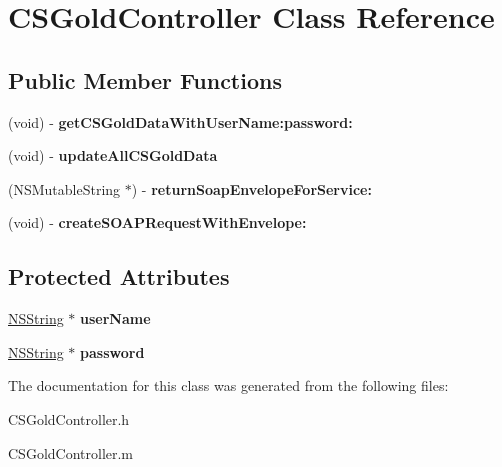 \hypertarget{interface_c_s_gold_controller}{
\section{CSGoldController Class Reference}
\label{interface_c_s_gold_controller}
}
\subsection*{Public Member Functions}
\begin{DoxyCompactItemize}
\item 
\hypertarget{interface_c_s_gold_controller_a8552228761af3e1aacc996d4c0c43e7e}{
(void) -\/ {\bfseries getCSGoldDataWithUserName:password:}}
\label{interface_c_s_gold_controller_a8552228761af3e1aacc996d4c0c43e7e}

\item 
\hypertarget{interface_c_s_gold_controller_a89ab38db9aed3fd0155300b1b419002d}{
(void) -\/ {\bfseries updateAllCSGoldData}}
\label{interface_c_s_gold_controller_a89ab38db9aed3fd0155300b1b419002d}

\item 
\hypertarget{interface_c_s_gold_controller_a7174dfe4f26ddb7d89c1037a3a88051a}{
(NSMutableString $\ast$) -\/ {\bfseries returnSoapEnvelopeForService:}}
\label{interface_c_s_gold_controller_a7174dfe4f26ddb7d89c1037a3a88051a}

\item 
\hypertarget{interface_c_s_gold_controller_a8f0e1f66c86b65ac8bae84a4e887271b}{
(void) -\/ {\bfseries createSOAPRequestWithEnvelope:}}
\label{interface_c_s_gold_controller_a8f0e1f66c86b65ac8bae84a4e887271b}

\end{DoxyCompactItemize}
\subsection*{Protected Attributes}
\begin{DoxyCompactItemize}
\item 
\hypertarget{interface_c_s_gold_controller_a54a3bf70ce2cc98450d6e403e8dcfb6c}{
\hyperlink{class_n_s_string}{NSString} $\ast$ {\bfseries userName}}
\label{interface_c_s_gold_controller_a54a3bf70ce2cc98450d6e403e8dcfb6c}

\item 
\hypertarget{interface_c_s_gold_controller_af5fbd7d7fb5ba341782013f9e2e4c735}{
\hyperlink{class_n_s_string}{NSString} $\ast$ {\bfseries password}}
\label{interface_c_s_gold_controller_af5fbd7d7fb5ba341782013f9e2e4c735}

\end{DoxyCompactItemize}


The documentation for this class was generated from the following files:\begin{DoxyCompactItemize}
\item 
CSGoldController.h\item 
CSGoldController.m\end{DoxyCompactItemize}
